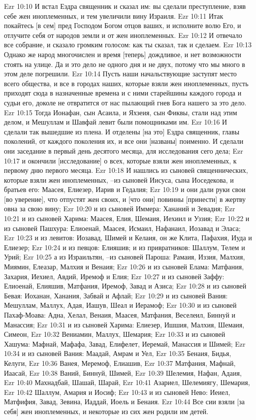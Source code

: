 Ezr 10:10  И встал Ездра священник и сказал им: вы сделали преступление, взяв себе жен иноплеменных, и тем увеличили вину Израиля.
Ezr 10:11  Итак покайтесь [в сем] пред Господом Богом отцов ваших, и исполните волю Его, и отлучите себя от народов земли и от жен иноплеменных.
Ezr 10:12  И отвечало все собрание, и сказало громким голосом: как ты сказал, так и сделаем.
Ezr 10:13  Однако же народ многочислен и время [теперь] дождливое, и нет возможности стоять на улице. Да и это дело не одного дня и не двух, потому что мы много в этом деле погрешили.
Ezr 10:14  Пусть наши начальствующие заступят место всего общества, и все в городах наших, которые взяли жен иноплеменных, пусть приходят сюда в назначенные времена и с ними старейшины каждого города и судьи его, доколе не отвратится от нас пылающий гнев Бога нашего за это дело.
Ezr 10:15  Тогда Ионафан, сын Асаила, и Яхзеия, сын Фиквы, стали над этим делом, и Мешуллам и Шавфай левит были помощниками им.
Ezr 10:16  И сделали так вышедшие из плена. И отделены [на это] Ездра священник, главы поколений, от каждого поколения их, и все они [названы] поименно. И сделали они заседание в первый день десятого месяца, для исследования сего дела;
Ezr 10:17  и окончили [исследование] о всех, которые взяли жен иноплеменных, к первому дню первого месяца.
Ezr 10:18  И нашлись из сыновей священнических, которые взяли жен иноплеменных, --из сыновей Иисуса, сына Иоседекова, и братьев его: Маасея, Елиезер, Иарив и Гедалия;
Ezr 10:19  и они дали руки свои [во уверение], что отпустят жен своих, и [что они] повинны [принести] в жертву овна за свою вину;
Ezr 10:20  и из сыновей Иммера: Хананий и Зевадия;
Ezr 10:21  и из сыновей Харима: Маасея, Елия, Шемаия, Иехиил и Уззия;
Ezr 10:22  и из сыновей Пашхура: Елиоенай, Маасея, Исмаил, Нафанаил, Иозавад и Эласа;
Ezr 10:23  и из левитов: Иозавад, Шимей и Келаия, он же Клита, Пафахия, Иуда и Елиезер;
Ezr 10:24  и из певцов: Елияшив; и из привратников: Шаллум, Телем и Урий;
Ezr 10:25  а из Израильтян, --из сыновей Пароша: Рамаия, Иззия, Малхия, Миямин, Елеазар, Малхия и Венаия;
Ezr 10:26  и из сыновей Елама: Матфания, Захария, Иехиел, Авдий, Иремоф и Елия;
Ezr 10:27  и из сыновей Заффу: Елиоенай, Елияшив, Матфания, Иремоф, Завад и Азиса;
Ezr 10:28  и из сыновей Бевая: Иоханан, Ханания, Забвай и Афлай;
Ezr 10:29  и из сыновей Вания: Мешуллам, Маллух, Адая, Иашув, Шеал и Иерамоф;
Ezr 10:30  и из сыновей Пахаф-Моава: Адна, Хелал, Венаия, Маасея, Матфания, Веселеил, Биннуй и Манассия;
Ezr 10:31  и из сыновей Харима: Елиезер, Ишшия, Малхия, Шемаия, Симеон,
Ezr 10:32  Вениамин, Маллух, Шемария;
Ezr 10:33  и из сыновей Хашума: Мафнай, Мафафа, Завад, Елифелет, Иеремай, Манассия и Шимей;
Ezr 10:34  и из сыновей Вания: Маадай, Амрам и Уел,
Ezr 10:35  Бенаия, Бидья, Келуги,
Ezr 10:36  Ванея, Меремоф, Елиашив,
Ezr 10:37  Матфания, Мафнай, Иаасай,
Ezr 10:38  Ваний, Биннуй, Шимей,
Ezr 10:39  Шелемия, Нафан, Адаия,
Ezr 10:40  Махнадбай, Шашай, Шарай,
Ezr 10:41  Азариел, Шелемиягу, Шемария,
Ezr 10:42  Шаллум, Амария и Иосиф;
Ezr 10:43  и из сыновей Нево: Иеиел, Матфифия, Завад, Зевина, Иаддай, Иоель и Бенаия.
Ezr 10:44  Все сии взяли [за себя] жен иноплеменных, и некоторые из сих жен родили им детей.


